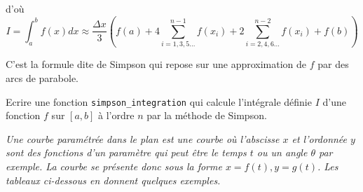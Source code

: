\begin{td}
\begin{enumerate}
	d'où
	$$I = \int_a^b f(x)dx \approx \frac{\Delta x}{3}
	\left(f(a) + 4\sum_{i=1,3,5...}^{n-1}f(x_i) + 2\sum_{i=2,4,6...}^{n-2}f(x_i) + f(b)\right)$$
	
	C'est la formule dite de Simpson qui repose sur une approximation de $f$ 
	par des arcs de parabole.

	Ecrire une fonction {\tt simpson\_integration} qui calcule l'intégrale définie $I$ d'une fonction 
	$f$ sur $[a,b]$ à l'ordre $n$ par la méthode de Simpson.
\end{enumerate}
\end{td}

\begin{td}\label{td:traces}
\em
Une courbe paramétrée dans le plan est une courbe où l'abscisse $x$ et l'ordonnée $y$
sont des fonctions d'un paramètre qui peut être le temps $t$ ou un angle $\theta$ par exemple.
La courbe se présente donc sous la forme $x = f(t), y= g(t)$. Les tableaux ci-dessous en donnent quelques
exemples.


\end{td}
